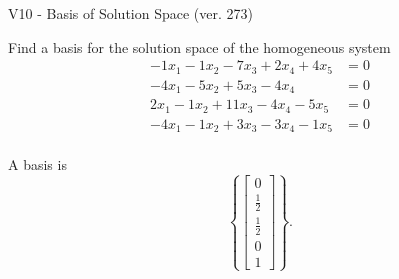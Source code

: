 \begin{exercise}
  \begin{exerciseTitle}V10 - Basis of Solution Space (ver. 273)\end{exerciseTitle}
  \begin{exerciseStatement}
    Find a basis for the solution space of the homogeneous system 
\begin{align*}
 -1 x_ 1 -1 x_ 2 -7 x_ 3 + 2 x_ 4 + 4 x_ 5 &= 0  \\ 
  -4 x_ 1 -5 x_ 2 + 5 x_ 3 -4 x_ 4 &= 0  \\ 
  2 x_ 1 -1 x_ 2 + 11 x_ 3 -4 x_ 4 -5 x_ 5 &= 0  \\ 
  -4 x_ 1 -1 x_ 2 + 3 x_ 3 -3 x_ 4 -1 x_ 5 &= 0  \\ 
 \end{align*}


 
  \end{exerciseStatement}

  \begin{exerciseAnswer}
   A basis is   
\[\left\{\left[\begin{array}{c}
0 \\
\frac{1}{2} \\
\frac{1}{2} \\
0 \\
1
\end{array}\right]\right\}.\]

  


  \end{exerciseAnswer}
\end{exercise}